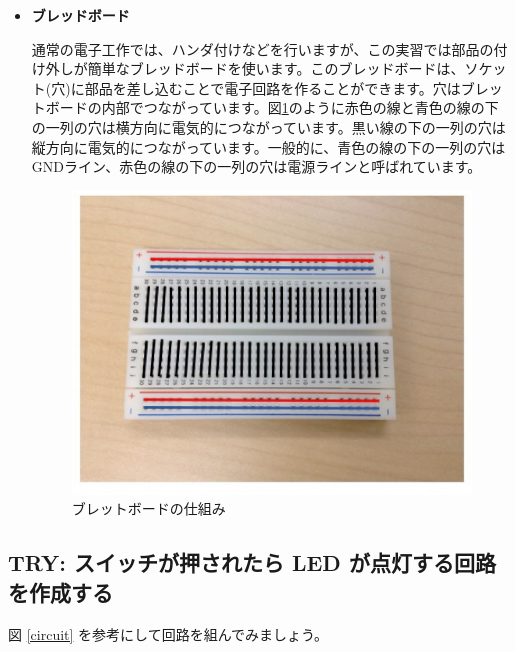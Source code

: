\documentclass[11pt,a4paper]{jarticle}
\begin{document}
\begin{itemize}
 \item \textbf{ブレッドボード} 
 
通常の電子工作では、ハンダ付けなどを行いますが、この実習では部品の付け外しが簡単なブレッドボードを使います。このブレッドボードは、ソケット(穴)に部品を差し込むことで電子回路を作ることができます。穴はブレットボードの内部でつながっています。図\ref{figure:mechanism_of_the_breadboard}のように赤色の線と青色の線の下の一列の穴は横方向に電気的につながっています。黒い線の下の一列の穴は縦方向に電気的につながっています。一般的に、青色の線の下の一列の穴はGNDライン、赤色の線の下の一列の穴は電源ラインと呼ばれています。

\begin{figure}[htb]
  \centering
  \includegraphics[width=1.0\columnwidth]{mechanism_of_the_breadboard.eps}
  \caption{ブレットボードの仕組み}
  \label{figure:mechanism_of_the_breadboard}
\end{figure}
       
\end{itemize}

\setcounter{nombre}{1}
\subsection*{TRY\thenombre: スイッチが押されたら LED が点灯する回路を作成する}
\label{base}

図 \ref{circuit} を参考にして回路を組んでみましょう。
\end{document}
